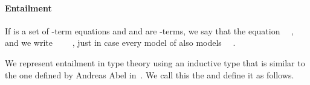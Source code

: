 \paragraph*{Entailment}

If  is a set of -term equations and  and  are -terms,
we say that   the equation ~~, and we write
~~~~, just in case every model of  also models
~~.

We represent entailment in type theory using an inductive type that is similar to
the one defined by Andreas Abel in~\cite{Abel:2021}.  We call this the 
and define it as follows.

\begin{code}%
\>[0]\<%
\\
\>[0]\AgdaSpace{}%
%
\>[14]\AgdaSymbol{(}\AgdaSpace{}%
\AgdaSymbol{:}\AgdaSpace{}%
\AgdaSymbol{\{}\AgdaSpace{}%
\AgdaSymbol{:}\AgdaSpace{}%
\AgdaSpace{}%
\AgdaSymbol{\}}\AgdaSpace{}%
\AgdaSpace{}%
\AgdaSymbol{(}\AgdaSpace{}%
\AgdaSpace{}%
\AgdaSpace{}%
\AgdaSpace{}%
\AgdaSymbol{)}\AgdaSpace{}%
\AgdaSymbol{(}\AgdaSpace{}%
\AgdaSymbol{))}\AgdaSpace{}%
\AgdaSymbol{:}\<%
\\
%
\>[14]\AgdaSymbol{(}\AgdaSpace{}%
\AgdaSymbol{:}\AgdaSpace{}%
\AgdaSpace{}%
\AgdaSymbol{)(}\AgdaSpace{}%
\AgdaSpace{}%
\AgdaSymbol{:}\AgdaSpace{}%
\AgdaSpace{}%
\AgdaSymbol{)}\AgdaSpace{}%
\AgdaSpace{}%
\AgdaSpace{}%
\AgdaSymbol{(}\AgdaSpace{}%
\AgdaSymbol{)}\AgdaSpace{}%
\<%
\\
%
\\[\AgdaEmptyExtraSkip]%
\>[0][@{}l@{\AgdaIndent{0}}]%
\>[1]%
\>[13]\AgdaSymbol{:}%
\>[16]\AgdaSymbol{\}\{}\AgdaSpace{}%
\AgdaSpace{}%
\AgdaSymbol{:}\AgdaSpace{}%
\AgdaSpace{}%
\AgdaSymbol{\}}\AgdaSpace{}%
\AgdaSpace{}%
\AgdaSymbol{(}\AgdaSpace{}%
\AgdaOperator{\AgdaInductiveConstructor{,}}\AgdaSpace{}%

\end{code}

